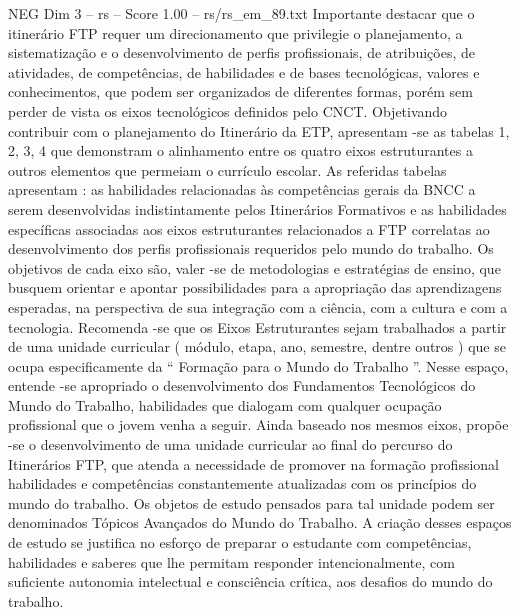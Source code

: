 \begin{textsample}{NEG Dim 3 – rs – Score 1.00 – rs/rs\_em\_89.txt}
Importante destacar que o itinerário FTP requer um direcionamento que privilegie o planejamento, a sistematização e o desenvolvimento de perfis profissionais, de atribuições, de atividades, de competências, de habilidades e de bases tecnológicas, valores e conhecimentos, que podem ser organizados de diferentes formas, porém sem perder de vista os eixos tecnológicos definidos pelo CNCT.
Objetivando contribuir com o planejamento do Itinerário da ETP, apresentam -se as tabelas 1, 2, 3, 4 que demonstram o alinhamento entre os quatro eixos estruturantes a outros elementos que permeiam o currículo escolar.
As referidas tabelas apresentam : as habilidades relacionadas às competências gerais da BNCC a serem desenvolvidas indistintamente pelos Itinerários Formativos e as habilidades específicas associadas aos eixos estruturantes relacionados a FTP correlatas ao desenvolvimento dos perfis profissionais requeridos pelo mundo do trabalho.
Os objetivos de cada eixo são, valer -se de metodologias e estratégias de ensino, que busquem orientar e apontar possibilidades para a apropriação das aprendizagens esperadas, na perspectiva de sua integração com a ciência, com a cultura e com a tecnologia.
Recomenda -se que os Eixos Estruturantes sejam trabalhados a partir de uma unidade curricular ( módulo, etapa, ano, semestre, dentre outros ) que se ocupa especificamente da “ Formação para o Mundo do Trabalho ”.
Nesse espaço, entende -se apropriado o desenvolvimento dos Fundamentos Tecnológicos do Mundo do Trabalho, habilidades que dialogam com qualquer ocupação profissional que o jovem venha a seguir.
Ainda baseado nos mesmos eixos, propõe -se o desenvolvimento de uma unidade curricular ao final do percurso do Itinerários FTP, que atenda a necessidade de promover na formação profissional habilidades e competências constantemente atualizadas com os princípios do mundo do trabalho.
Os objetos de estudo pensados para tal unidade podem ser denominados Tópicos Avançados do Mundo do Trabalho.
A criação desses espaços de estudo se justifica no esforço de preparar o estudante com competências, habilidades e saberes que lhe permitam responder intencionalmente, com suficiente autonomia intelectual e consciência crítica, aos desafios do mundo do trabalho.

\end{textsample}
